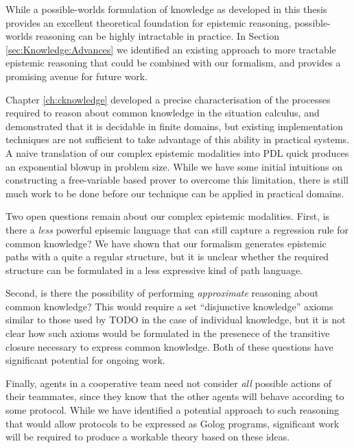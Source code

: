 While a possible-worlds formulation of knowledge as developed in this
thesis provides an excellent theoretical foundation for epistemic
reasoning, possible-worlds reasoning can be highly intractable in
practice. In Section \ref{sec:Knowledge:Advances} we identified an
existing approach to more tractable epistemic reasoning that could
be combined with our formalism, and provides a promising avenue for
future work.

Chapter \ref{ch:cknowledge} developed a precise characterisation
of the processes required to reason about common knowledge in the
situation calculus, and demonstrated that it is decidable in finite
domains, but existing implementation techniques are not sufficient
to take advantage of this ability in practical systems. A naive translation
of our complex epistemic modalities into PDL quick produces an exponential
blowup in problem size. While we have some initial intuitions on constructing
a free-variable based prover to overcome this limitation, there is
still much work to be done before our technique can be applied in
practical domains.

Two open questions remain about our complex epistemic modalities.
First, is there a \emph{less }powerful episemic language that can
still capture a regression rule for common knowledge? We have shown
that our formalism generates epistemic paths with a quite a regular
structure, but it is unclear whether the required structure can be
formulated in a less expressive kind of path language.

Second, is there the possibility of performing \emph{approximate}
reasoning about common knowledge? This would require a set {}``disjunctive
knowledge'' axioms similar to those used by TODO in the case of individual
knowledge, but it is not clear how such axioms would be formulated
in the presenece of the transitive closure necessary to express common
knowledge. Both of these questions have significant potential for
ongoing work.

Finally, agents in a cooperative team need not consider \emph{all}
possible actions of their teammates, since they know that the other
agents will behave according to some protocol. While we have identified
a potential approach to such reasoning that would allow protocols
to be expressed as Golog programs, significant work will be required
to produce a workable theory based on these ideas.

